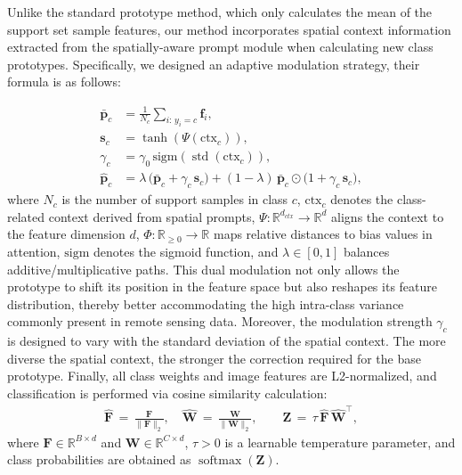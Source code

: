 ﻿\documentclass[letterpaper,journal]{IEEEtran}
\newcommand{\sigmafunc}{\mathrm{sigm}}
\begin{document}
Unlike the standard prototype method, which only calculates the mean of the support set sample features, our method incorporates spatial context information extracted from the spatially-aware prompt module when calculating new class prototypes. Specifically, we designed an adaptive modulation strategy, their formula is as follows: 

\begin{align}
\label{eq:base_prototype}
\bar{\mathbf{p}}_c &= \frac{1}{N_c}\sum_{i:\,y_i=c} \mathbf{f}_i,\\
\label{eq:spatial_weight}
\mathbf{s}_c &= \tanh\!\left(\Psi(\mathrm{ctx}_c)\right),\\
\label{eq:modulation_strength}
\gamma_c &= \gamma_0 \, \sigmafunc\!\left(\operatorname{std}(\mathrm{ctx}_c)\right),\\
\label{eq:adaptive_modulation}
\hat{\mathbf{p}}_c &= \lambda\,\big(\bar{\mathbf{p}}_c + \gamma_c\,\mathbf{s}_c\big)
                 + (1-\lambda)\, \bar{\mathbf{p}}_c \odot \big(1 + \gamma_c\, \mathbf{s}_c\big),
\end{align} 
where $N_c$ is the number of support samples in class $c$, $\mathrm{ctx}_c$ denotes the class-related context derived from spatial prompts, $\Psi: \mathbb{R}^{d_{ctx}} \to \mathbb{R}^{d}$ aligns the context to the feature dimension $d$, $\Phi: \mathbb{R}_{\ge 0} \to \mathbb{R}$ maps relative distances to bias values in attention, $\sigmafunc$ denotes the sigmoid function, and $\lambda\in[0,1]$ balances additive/multiplicative paths.
This dual modulation not only allows the prototype to shift its position in the feature space but also reshapes its feature distribution, thereby better accommodating the high intra-class variance commonly present in remote sensing data. Moreover, the modulation strength $\gamma_c$ is designed to vary with the standard deviation of the spatial context. The more diverse the spatial context, the stronger the correction required for the base prototype. Finally, all class weights and image features are L2-normalized, and classification is performed via cosine similarity calculation:
\begin{align}
\label{eq:cosine_classifier}
\hat{\mathbf{F}} \,=\, \frac{\mathbf{F}}{\lVert \mathbf{F}\rVert_2},\quad
\hat{\mathbf{W}} \,=\, \frac{\mathbf{W}}{\lVert \mathbf{W}\rVert_2},\qquad
\mathbf{Z} \,=\, \tau\, \hat{\mathbf{F}}\, \hat{\mathbf{W}}^{\top},
\end{align} where $\mathbf{F}\in\mathbb{R}^{B\times d}$ and $\mathbf{W}\in\mathbb{R}^{C\times d}$, $\tau>0$ is a learnable temperature parameter, and class probabilities are obtained as $\operatorname{softmax}(\mathbf{Z})$.
\end{document}
